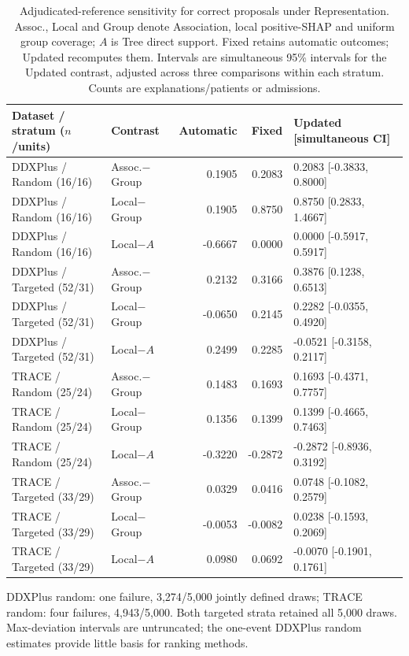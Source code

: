 \begin{table}[!tbp]\centering\footnotesize\setlength{\tabcolsep}{3pt}
\caption{Adjudicated-reference sensitivity for correct proposals under Representation. Assoc., Local and Group denote Association, local positive-SHAP and uniform group coverage; $A$ is Tree direct support. Fixed retains automatic outcomes; Updated recomputes them. Intervals are simultaneous 95\% intervals for the Updated contrast, adjusted across three comparisons within each stratum. Counts are explanations/patients or admissions.}
\label{tab:adjudicated-contrasts}
\begin{tabular}{llrrl}\toprule
Dataset / stratum ($n$/units) & Contrast & Automatic & Fixed & Updated [simultaneous CI]\\\midrule
DDXPlus / Random (16/16) & Assoc.$-$Group & 0.1905 & 0.2083 & 0.2083 [-0.3833, 0.8000] \\
DDXPlus / Random (16/16) & Local$-$Group & 0.1905 & 0.8750 & 0.8750 [0.2833, 1.4667] \\
DDXPlus / Random (16/16) & Local$-A$ & -0.6667 & 0.0000 & 0.0000 [-0.5917, 0.5917] \\
DDXPlus / Targeted (52/31) & Assoc.$-$Group & 0.2132 & 0.3166 & 0.3876 [0.1238, 0.6513] \\
DDXPlus / Targeted (52/31) & Local$-$Group & -0.0650 & 0.2145 & 0.2282 [-0.0355, 0.4920] \\
DDXPlus / Targeted (52/31) & Local$-A$ & 0.2499 & 0.2285 & -0.0521 [-0.3158, 0.2117] \\
TRACE / Random (25/24) & Assoc.$-$Group & 0.1483 & 0.1693 & 0.1693 [-0.4371, 0.7757] \\
TRACE / Random (25/24) & Local$-$Group & 0.1356 & 0.1399 & 0.1399 [-0.4665, 0.7463] \\
TRACE / Random (25/24) & Local$-A$ & -0.3220 & -0.2872 & -0.2872 [-0.8936, 0.3192] \\
TRACE / Targeted (33/29) & Assoc.$-$Group & 0.0329 & 0.0416 & 0.0748 [-0.1082, 0.2579] \\
TRACE / Targeted (33/29) & Local$-$Group & -0.0053 & -0.0082 & 0.0238 [-0.1593, 0.2069] \\
TRACE / Targeted (33/29) & Local$-A$ & 0.0980 & 0.0692 & -0.0070 [-0.1901, 0.1761] \\
\bottomrule\end{tabular}
\par\smallskip\raggedright
DDXPlus random: one failure, 3,274/5,000 jointly defined draws; TRACE random: four failures, 4,943/5,000. Both targeted strata retained all 5,000 draws. Max-deviation intervals are untruncated; the one-event DDXPlus random estimates provide little basis for ranking methods.
\end{table}
